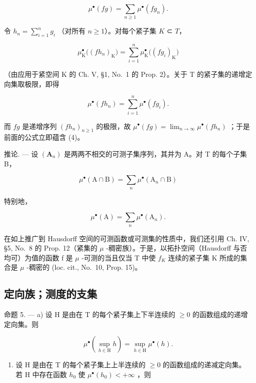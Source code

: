 \[
\mu^ {\bullet} (f g) = \sum_ {n \geqslant 1} \mu^ {\bullet} (f g _ {n}).\tag{4}
\]

令 \(h_n = \sum_{i=1}^{n} g_i\) （对所有 \(n \geqslant 1\)）。对每个紧子集 \(K\) ⊂ \(T\)，

\[
\mu_ {\mathrm{K}} ^ {\bullet} \big ((f h _ {n}) _ {\mathrm{K}} \big) = \sum_ {i = 1} ^ {n} \mu_ {\mathrm{K}} ^ {\bullet} \big ((f g _ {i}) _ {\mathrm{K}} \big)
\]

（由应用于紧空间 K 的 Ch. V, §1, No.~1 的 Prop. 2）。关于 T 的紧子集的递增定向集取极限，即得

\[
\mu^ {\bullet} (f h _ {n}) = \sum_ {i = 1} ^ {n} \mu^ {\bullet} (f g _ {i}).
\]

而 \(fg\) 是递增序列 \((fh_n)_{n\geqslant 1}\) 的极限，故 \(\mu^{\bullet}(fg) = \lim_{n\to \infty}\mu^{\bullet}(fh_n)\) ；于是前面的公式立即蕴含 (4)。

推论. --- 设 \((\mathbf{A}_{n})\) 是两两不相交的可测子集序列，其并为 A。对 T 的每个子集 B，

\[
\mu^ {\bullet} (\mathrm{A} \cap \mathrm{B}) = \sum_ {n} \mu^ {\bullet} (\mathrm{A} _ {n} \cap \mathrm{B})
\]

特别地，

\[
\mu^ {\bullet} (\mathrm{A}) = \sum_ {n} \mu^ {\bullet} (\mathrm{A} _ {n}).
\]

在如上推广到 Hausdorff 空间的可测函数或可测集的性质中，我们还引用 Ch. IV, §5, No.~8 的 Prop. 12（紧集的 \(\mu\) -稠密族）。于是，以拓扑空间（Hausdorff 与否均可）为值的函数 f 是 \(\mu\) -可测的当且仅当 T 中使 \(f_{K}\) 连续的紧子集 K 所成的集合是 \(\mu\) -稠密的 (loc. cit., No.~10, Prop. 15)。

\subsection{定向族；测度的支集}

命题 5. --- a) 设 H 是由在 T 的每个紧子集上下半连续的 \(\geqslant 0\) 的函数组成的递增定向集。则

\[
\mu^ {\bullet} \left(\sup _ {h \in \mathrm{H}} h\right) = \sup _ {h \in \mathrm{H}} \mu^ {\bullet} (h).\tag{5}
\]

\begin{enumerate}
\def\labelenumi{\alph{enumi})}
\setcounter{enumi}{1}
\tightlist
\item
  设 H 是由在 T 的每个紧子集上上半连续的 \(\geqslant0\) 的函数组成的递减定向集。若 H 中存在函数 \(h_{0}\) 使 \(\mu^{\bullet}(h_{0})<+\infty\) ，则
\end{enumerate}


